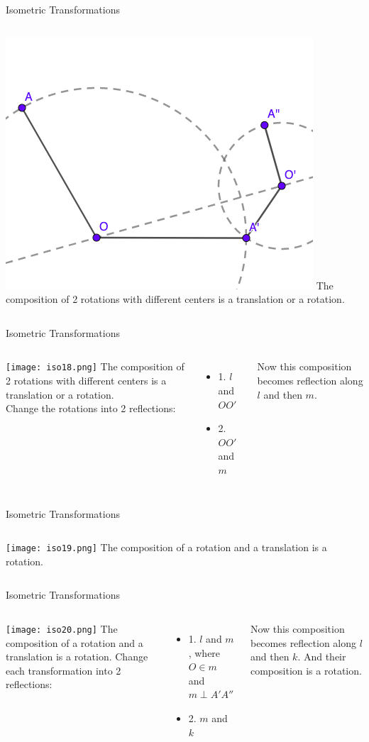 \documentclass{beamer}
\begin{document}
\begin{frame}{Isometric Transformations}
	\begin{columns}
		\includegraphics[scale=0.4]{iso17.png}
		The composition of 2 rotations with different centers
		is a translation or a rotation.
	\end{columns}
\end{frame}
\begin{frame}{Isometric Transformations}
	\begin{columns}
		\column{0.6\textwidth}
		\texttt{[image: iso18.png]}
		\column{0.4\textwidth}
		The composition of 2 rotations with different centers
		is a translation or a rotation.\\
		\phantom{Spacing}
		Change the rotations into 2 reflections:
		\begin{itemize}
			\item 1. $l$ and $O O'$
			\item 2. $O O'$ and $m$
		\end{itemize}
		Now this composition becomes reflection along $l$ and
		then $m$. 
	\end{columns}
\end{frame}
\begin{frame}{Isometric Transformations}
	\begin{columns}
		\texttt{[image: iso19.png]}
		The composition of a rotation and a translation is a
		rotation.
	\end{columns}
\end{frame}
\begin{frame}{Isometric Transformations}
	\begin{columns}
		\column{0.6\textwidth}
		\texttt{[image: iso20.png]}
		\column{0.4\textwidth}
		The composition of a rotation and a translation is a
		rotation.
		\phantom{Spacing}
		Change each transformation into 2 reflections:
		\begin{itemize}
			\item 1. $l$ and $m$, where $O\in m$ and 
				$m\perp A'A''$
			\item 2. $m$ and $k$
		\end{itemize}
		Now this composition becomes reflection along $l$ and
		then $k$. And their composition is a rotation.
	\end{columns}
\end{frame}
\end{document}
